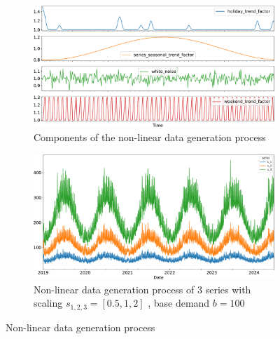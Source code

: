 \begin{figure}[t]
    \centering
    \begin{subfigure}[t]{0.45\textwidth}
        \centering
        \includegraphics[width=\textwidth]{chapters/04_feature_importance_estimation/img/non_linear_time_series_components}
        \caption{Components of the non-linear data generation process}
        \label{fig:nonlinear_data_generation_components}
    \end{subfigure}
    \hfill
    \begin{subfigure}[t]{0.45\textwidth}
        \includegraphics[width=\textwidth]{chapters/04_feature_importance_estimation/img/non_linear_time_series}
        \caption{Non-linear data generation process of 3 series with scaling $s_{1,2,3} = [0.5,1,2]$ , base demand $b=100$ }
        \label{fig:nonlinear_data_generation}
    \end{subfigure}
    \caption{Non-linear data generation process}
\end{figure}

